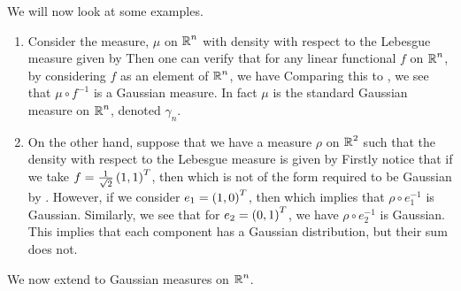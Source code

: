 \documentclass[../main.tex]{subfiles}
\begin{document}
\begin{example}
\label{ex:nd_gauss}
We will now look at some examples.
\begin{enumerate}
    \item Consider the measure, $\mu$ on $\operatorname{\mathbb{R}}^n$ with density with respect to the Lebesgue measure given by 
    Then one can verify that for any linear functional $f$ on $\operatorname{\mathbb{R}}^n$, by considering $f$ as an element of $\operatorname{\mathbb{R}}^n$, we have  Comparing this to , we see that $\mu\circ f^{-1}$ is a Gaussian measure. In fact $\mu$ is the standard Gaussian measure on $\operatorname{\mathbb{R}}^n$, denoted $\gamma_n$.
    \item On the other hand, suppose that we have a measure $\rho$ on $\operatorname{\mathbb{R}}^2$ such that the density with respect to the Lebesgue measure is given by  
    Firstly notice that if we take $f = \frac{1}{\sqrt{2}}\del{1,1}^T$, then  which is not of the form required to be Gaussian by . However, if we consider $e_1 = \del{1,0}^T$, then  which implies that $\rho\circ e_1^{-1}$ is Gaussian. Similarly, we see that for $e_2 = \del{0,1}^T$, we have $\rho\circ e_2^{-1}$ is Gaussian. This implies that each component has a Gaussian distribution, but their sum does not.
\end{enumerate}
\end{example}

We now extend  to Gaussian measures on $\operatorname{\mathbb{R}}^n$.
\end{document}

